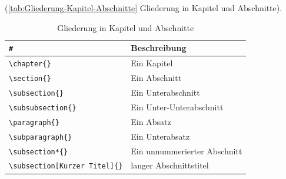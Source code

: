 (\autoref{tab:Gliederung-Kapitel-Abschnitte} Gliederung in Kapitel und Abschnitte).
\begin{table}[!hb]%
	\centering
	\begin{tabular} {ll}
		\toprule %
		\verb|#| & \textbf{Beschreibung} \\
	  \midrule
		\verb|\chapter{}      | & Ein Kapitel\\
		\verb|\section{}      | & Ein Abschnitt\\
		\verb|\subsection{}   | & Ein Unterabschnitt\\
		\verb|\subsubsection{}| & Ein Unter-Unterabschnitt\\
		\verb|\paragraph{}    | & Ein Absatz\\
		\verb|\subparagraph{} | & Ein Unterabsatz\\
		\verb|\subsection*{}  | & Ein unnummerierter Abschnitt\\
		\verb|\subsection[Kurzer Titel]{}| & langer Abschnittstitel\\
		\bottomrule
	\end{tabular}
	\caption{Gliederung in Kapitel und Abschnitte}	%
	\label{tab:Gliederung-Kapitel-Abschnitte}	%
\end{table}

